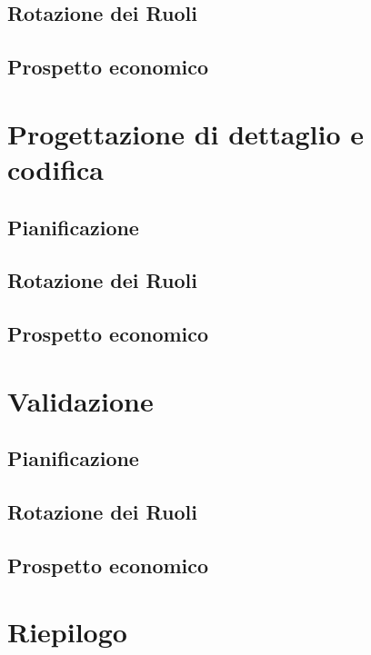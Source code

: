 \documentclass[12pt,a4paper]{article}
\begin{document}
\subsection{Rotazione dei Ruoli}

\subsection{Prospetto economico}

\newpage
\section{Progettazione di dettaglio e codifica} %

\subsection{Pianificazione}

\subsection{Rotazione dei Ruoli}

\subsection{Prospetto economico}

\newpage
\section{Validazione} %

\subsection{Pianificazione}

\subsection{Rotazione dei Ruoli}

\subsection{Prospetto economico}


\newpage
\section{Riepilogo}
\end{document}
